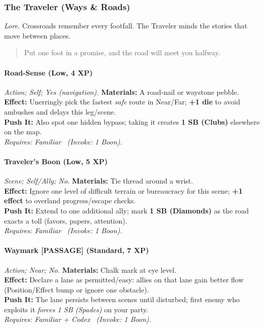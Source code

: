 \subsubsection{The Traveler (Ways \& Roads)}
\textit{Lore.} Crossroads remember every footfall. The Traveler minds the stories that move between places.

\begin{quote}
Put one foot in a promise, and the road will meet you halfway.
\end{quote}

\paragraph{Road-Sense (Low, 4 XP)} \emph{Action; Self; Yes (navigation).}
\textbf{Materials:} A road-nail or waystone pebble.\\
\textbf{Effect:} Unerringly pick the fastest \emph{safe} route in Near/Far; \textbf{+1 die} to avoid ambushes and delays this leg/scene.\\
\textbf{Push It:} Also spot one hidden bypass; taking it creates \textbf{1 SB (Clubs)} elsewhere on the map.\\
\emph{Requires: Familiar \ (\textit{Invoke:} 1 Boon).}

\paragraph{Traveler’s Boon (Low, 5 XP)} \emph{Scene; Self/Ally; No.}
\textbf{Materials:} Tie thread around a wrist.\\
\textbf{Effect:} Ignore one level of difficult terrain or bureaucracy for this scene; \textbf{+1 effect} to overland progress/escape checks.\\
\textbf{Push It:} Extend to one additional ally; mark \textbf{1 SB (Diamonds)} as the road exacts a toll (favors, papers, attention).\\
\emph{Requires: Familiar \ (\textit{Invoke:} 1 Boon).}

\paragraph{Waymark \textnormal{[PASSAGE]} (Standard, 7 XP)} \emph{Action; Near; No.}
\textbf{Materials:} Chalk mark at eye level.\\
\textbf{Effect:} Declare a lane as permitted/easy: allies on that lane gain better flow (Position/Effect bump or ignore one obstacle).\\
\textbf{Push It:} The lane persists between scenes until disturbed; first enemy who exploits it \emph{forces 1 SB (Spades)} on your party.\\
\emph{Requires: Familiar + Codex \ (\textit{Invoke:} 1 Boon).}

